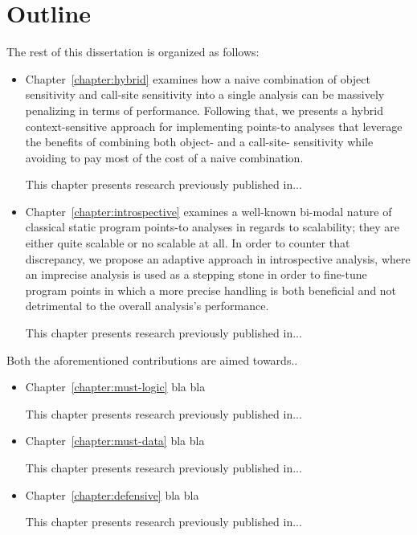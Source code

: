 \section{Outline}

The rest of this dissertation is organized as follows:
\begin{itemize}[$\bullet$]
\item Chapter~\ref{chapter:hybrid} examines how a naive combination of object sensitivity and call-site sensitivity into a single analysis can be massively penalizing in terms of performance. Following that, we presents a hybrid context-sensitive approach for implementing points-to analyses that leverage the benefits of combining both object- and a call-site- sensitivity while avoiding to pay most of the cost of a naive combination.

This chapter presents research previously published in... %

\item Chapter~\ref{chapter:introspective} examines a well-known bi-modal nature of classical static program points-to analyses in regards to scalability; they are either quite scalable or no scalable at all. In order to counter that discrepancy, we propose an adaptive approach in introspective analysis, where an imprecise analysis is used as a stepping stone in order to fine-tune program points in which a more precise handling is both beneficial and not detrimental to the overall analysis's performance.

This chapter presents research previously published in...
\end{itemize}

Both the aforementioned contributions are aimed towards..

\begin{itemize}[$\bullet$]
\item Chapter~\ref{chapter:must-logic} bla bla

This chapter presents research previously published in...

\item Chapter~\ref{chapter:must-data} bla bla

This chapter presents research previously published in...

\item Chapter~\ref{chapter:defensive} bla bla

This chapter presents research previously published in...
\end{itemize}

